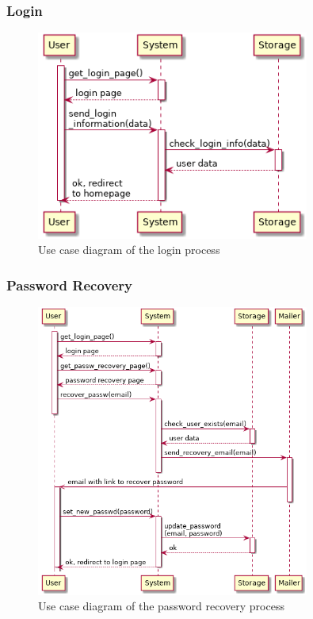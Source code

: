 \subsubsection{Login}

\newpage
\begin{figure}[htp]
	\centering
	\includegraphics[width=0.8\textwidth]{images/useCases/login.png}
	\caption{Use case diagram of the login process}
	\label{fig:userpage}
\end{figure}
\newpage
\subsubsection{Password Recovery}

\begin{figure}[htp]
	\centering
	\includegraphics[width=0.8\textwidth]{images/useCases/password_recovery.png}
	\caption{Use case diagram of the password recovery process}
	\label{fig:userpage}
\end{figure}
\newpage

